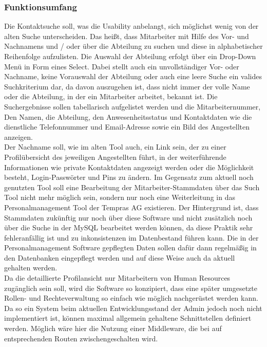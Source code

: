     \subsubsection{Funktionsumfang}
        Die Kontaktsuche soll, was die Usability anbelangt, sich möglichst wenig von der alten Suche unterscheiden. Das heißt, dass Mitarbeiter mit Hilfe des Vor- und Nachnamens und / oder über die Abteilung zu suchen und diese in alphabetischer Reihenfolge aufzulisten. Die Auswahl der Abteilung erfolgt über ein Drop-Down Menü in Form eines Select. Dabei stellt auch ein unvollständiger Vor- oder Nachname, keine Vorauswahl der Abteilung oder auch eine \glqq leere Suche\grqq{} ein valides Suchkriterium dar, da davon auszugehen ist, dass nicht immer der volle Name oder die Abteilung, in der ein Mitarbeiter arbeitet, bekannt ist. Die Suchergebnisse sollen tabellarisch aufgelistet werden und die Mitarbeiternummer, Den Namen, die Abteilung, den Anwesenheitsstatus und Kontaktdaten wie die dienstliche Telefonnummer und Email-Adresse sowie ein Bild des Angestellten anzeigen.\\
        Der Nachname soll, wie im alten Tool auch, ein Link sein, der zu einer Profilübersicht des jeweiligen Angestellten führt, in der weiterführende Informationen wie private Kontaktdaten angezeigt werden oder die Möglichkeit besteht, Login-Passwörter und Pins zu ändern. Im Gegensatz zum aktuell noch genutzten Tool soll eine Bearbeitung der Mitarbeiter-Stammdaten über das Such Tool nicht mehr möglich sein, sondern nur noch eine Weiterleitung in das Personalmanagement Tool der Tempras AG existieren. Der Hintergrund ist, dass Stammdaten zukünftig nur noch über diese Software und nicht zusätzlich noch über die Suche in der MySQL bearbeitet werden können, da diese Praktik sehr fehleranfällig ist und zu inkonsistenzen im Datenbestand führen kann. Die in der Personalmanagement Software gepflegten Daten sollen dafür dann regelmäßig in den Datenbanken eingepflegt werden und auf diese Weise auch da aktuell gehalten werden.\\
        Da die detaillierte Profilansicht nur Mitarbeitern von Human Resources zugänglich sein soll, wird die Software so konzipiert, dass eine später umgesetzte Rollen- und Rechteverwaltung so einfach wie möglich nachgerüstet werden kann. Da so ein System beim aktuellen Entwicklungsstand der Admin jedoch noch nicht implementiert ist, können maximal allgemein gehaltene Schnittstellen definiert werden. Möglich wäre hier die Nutzung einer Middleware, die bei auf entsprechenden Routen zwischengeschalten wird.

